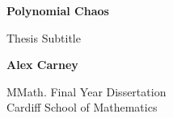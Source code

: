\begin{titlepage}
    \begin{center}
        \vspace*{5cm}

        \textbf{Polynomial Chaos}

        \vspace{0.5cm}
        Thesis Subtitle

        \vspace{1.5cm}

        \textbf{Alex Carney}

        \vfill

        MMath. Final Year Dissertation\\

        \vspace{0.5cm}
        Cardiff School of Mathematics

        \vspace{1.5cm}



    \end{center}
\end{titlepage}
